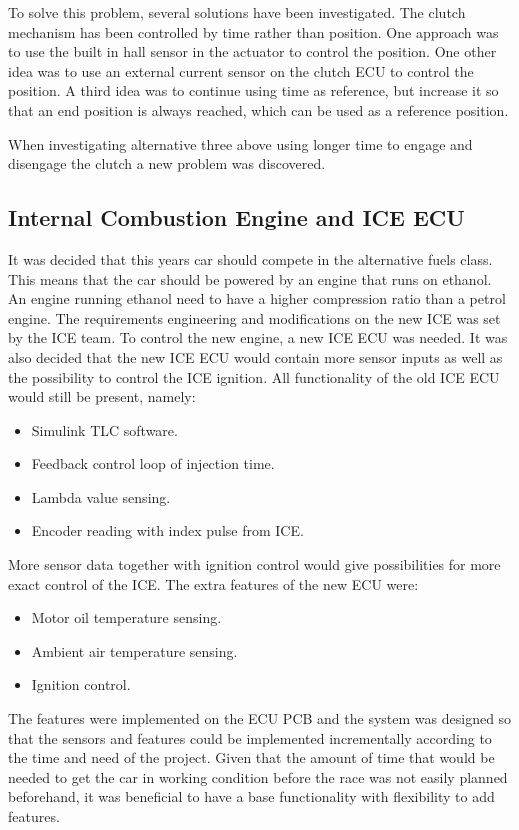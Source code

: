 To solve this problem, several solutions have been investigated. The clutch mechanism has been controlled by time rather than position. One approach was to use the built in hall sensor in the actuator to control the position. One other idea was to use an external current sensor on the clutch ECU to control the position. A third idea was to continue using time as reference, but increase it so that an end position is always reached, which can be used as a reference position.

When investigating alternative three above using longer time to engage and disengage the clutch a new problem was discovered. 


\subsection{Internal Combustion Engine and ICE ECU}
It was decided that this years car should compete in the alternative fuels
class. This means that the car should be powered by an engine that runs on
ethanol. An engine running ethanol need to have a higher compression ratio than
a petrol engine.
The requirements engineering and modifications on the new ICE was set by the ICE
team. To control the new engine, a new ICE ECU was needed. It was also decided
that the new ICE ECU would contain more sensor inputs as well as the possibility
to control the ICE ignition. All functionality of the old ICE ECU would still be
present, namely:
\begin{itemize}
    \item Simulink TLC software.
    \item Feedback control loop of injection time.
    \item Lambda value sensing.
    \item Encoder reading with index pulse from ICE\@.
\end{itemize}
More sensor data together with ignition control would give possibilities
for more exact control of the ICE\@. The extra features of the new ECU were:
\begin{itemize}
    \item Motor oil temperature sensing.
    \item Ambient air temperature sensing.
    \item Ignition control.
\end{itemize}
The features were implemented on the ECU PCB and the system was designed so that
the sensors and features could be implemented incrementally according to the
time and need of the project. Given that the amount of time that would be needed
to get the car in working condition before the race was not easily planned
beforehand, it was beneficial to have a base functionality with flexibility to
add features.

